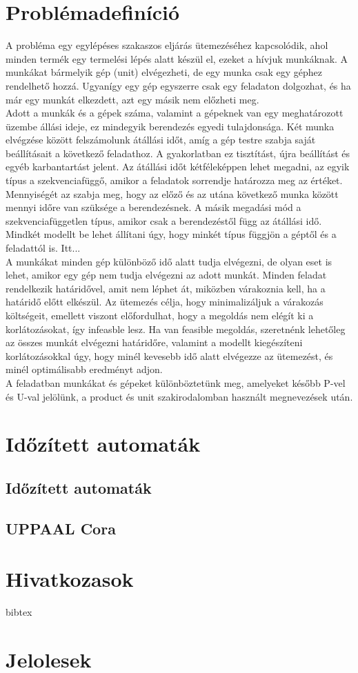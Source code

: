 \documentclass {report}
\begin{document}
\chapter{Problémadefiníció}
A probléma egy egylépéses szakaszos eljárás ütemezéséhez kapcsolódik, ahol minden termék egy termelési lépés alatt készül el, ezeket a hívjuk munkáknak. A munkákat bármelyik gép (unit) elvégezheti, de egy munka csak egy géphez rendelhető hozzá. Ugyanígy egy gép egyszerre csak egy feladaton dolgozhat, és ha már egy munkát elkezdett, azt egy másik nem előzheti meg. \\
Adott a munkák és a gépek száma, valamint a gépeknek van egy meghatározott üzembe állási ideje, ez mindegyik berendezés egyedi tulajdonsága. Két munka elvégzése között felszámolunk átállási időt, amíg a gép testre szabja saját beállításait a következő feladathoz. A gyakorlatban ez tisztítást, újra beállítást és egyéb karbantartást jelent. Az átállási időt kétféleképpen lehet megadni, az egyik típus a szekvenciafüggő, amikor a feladatok sorrendje határozza meg az értéket. Mennyiségét az szabja meg, hogy az előző és az utána következő munka között mennyi időre van szüksége a berendezésnek. A másik megadási mód a szekvenciafüggetlen típus, amikor csak a berendezéstől függ az átállási idő. Mindkét modellt be lehet állítani úgy, hogy minkét típus függjön a géptől és a feladattól is. Itt... \\
A munkákat minden gép különböző idő alatt tudja elvégezni, de olyan eset is lehet, amikor egy gép nem tudja elvégezni az adott munkát. Minden feladat rendelkezik határidővel, amit nem léphet át, miközben várakoznia kell, ha a határidő előtt elkészül. Az ütemezés célja, hogy minimalizáljuk a várakozás költségeit, emellett viszont előfordulhat, hogy a megoldás nem elégít ki a korlátozásokat, így infeasble lesz. Ha van feasible megoldás, szeretnénk lehetőleg az összes munkát elvégezni határidőre, valamint a modellt kiegészíteni korlátozásokkal úgy, hogy minél kevesebb idő alatt elvégezze az ütemezést, és minél optimálisabb eredményt adjon.  \\
A feladatban munkákat és gépeket különböztetünk meg, amelyeket később P-vel és U-val jelölünk, a product és unit szakirodalomban használt megnevezések után.

\chapter{Időzített automaták}
\section{Időzített automaták}
\section{UPPAAL Cora}


\chapter*{Hivatkozasok}
bibtex

\appendix

\chapter{Jelolesek}
\end{document}
